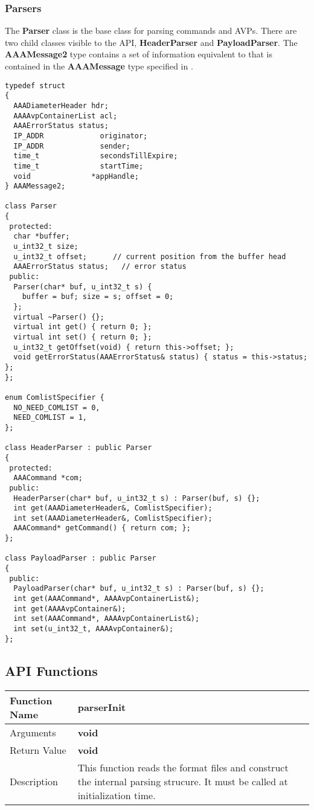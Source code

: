 \subsubsection{Parsers}

The {\bf Parser} class is the base class for parsing commands and AVPs.
There are two child classes visible to the API, {\bf HeaderParser} and
{\bf PayloadParser}.  The {\bf AAAMessage2} type contains a set
of information equivalent to that is contained in the {\bf AAAMessage}
type specified in \cite{api-draft}.

\begin{verbatim}
typedef struct 
{
  AAADiameterHeader hdr;
  AAAAvpContainerList acl;
  AAAErrorStatus status;
  IP_ADDR             originator;
  IP_ADDR             sender;
  time_t              secondsTillExpire;
  time_t              startTime;
  void              *appHandle;
} AAAMessage2;

class Parser
{
 protected:
  char *buffer;
  u_int32_t size;
  u_int32_t offset;      // current position from the buffer head
  AAAErrorStatus status;   // error status 
 public:
  Parser(char* buf, u_int32_t s) {
    buffer = buf; size = s; offset = 0;
  };
  virtual ~Parser() {};
  virtual int get() { return 0; };
  virtual int set() { return 0; };
  u_int32_t getOffset(void) { return this->offset; };
  void getErrorStatus(AAAErrorStatus& status) { status = this->status; };
};

enum ComlistSpecifier {
  NO_NEED_COMLIST = 0,
  NEED_COMLIST = 1,
};

class HeaderParser : public Parser
{
 protected:
  AAACommand *com;
 public:
  HeaderParser(char* buf, u_int32_t s) : Parser(buf, s) {};
  int get(AAADiameterHeader&, ComlistSpecifier);
  int set(AAADiameterHeader&, ComlistSpecifier);
  AAACommand* getCommand() { return com; };
};

class PayloadParser : public Parser
{
 public:
  PayloadParser(char* buf, u_int32_t s) : Parser(buf, s) {};
  int get(AAACommand*, AAAAvpContainerList&);
  int get(AAAAvpContainer&);
  int set(AAACommand*, AAAAvpContainerList&);
  int set(u_int32_t, AAAAvpContainer&);
};
\end{verbatim}

\subsection{API Functions}

\begin{flushleft}
\begin{tabular}[t]{|l|p{3in}|}\hline
 Function Name & {\bf parserInit}
\\\hline
 Arguments & {\bf void}
\\\hline
 Return Value & {\bf void}
\\\hline
 Description & 
 This function reads the format files and construct the internal parsing
 strucure.  It must be called at initialization time.  
 \\\hline
\end{tabular}
\end{flushleft}

